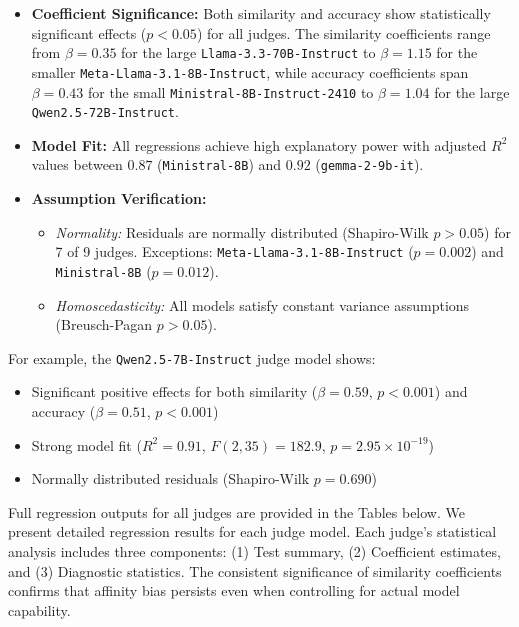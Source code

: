 \begin{itemize}
    \item \textbf{Coefficient Significance:} Both similarity and accuracy show statistically significant effects ($p<0.05$) for all judges. The similarity coefficients range from $\beta=0.35$ for the large \texttt{Llama-3.3-70B-Instruct} to $\beta=1.15$ for the smaller \texttt{Meta-Llama-3.1-8B-Instruct}, while accuracy coefficients span $\beta=0.43$ for the small \texttt{Ministral-8B-Instruct-2410} to $\beta=1.04$ for the large \texttt{Qwen2.5-72B-Instruct}.
    
    \item \textbf{Model Fit:} All regressions achieve high explanatory power with adjusted $R^2$ values between $0.87$ (\texttt{Ministral-8B}) and $0.92$ (\texttt{gemma-2-9b-it}).
    
    \item \textbf{Assumption Verification:}
    \begin{itemize}
        \item \textit{Normality:} Residuals are normally distributed (Shapiro-Wilk $p>0.05$) for 7 of 9 judges. Exceptions: \texttt{Meta-Llama-3.1-8B-Instruct} ($p=0.002$) and \texttt{Ministral-8B} ($p=0.012$).
        \item \textit{Homoscedasticity:} All models satisfy constant variance assumptions (Breusch-Pagan $p>0.05$).
    \end{itemize}
\end{itemize}

For example, the \texttt{Qwen2.5-7B-Instruct} judge model shows:

\begin{itemize}
    \item Significant positive effects for both similarity ($\beta=0.59$, $p<0.001$) and accuracy ($\beta=0.51$, $p<0.001$)
    \item Strong model fit ($R^2=0.91$, $F(2,35)=182.9$, $p=2.95\times10^{-19}$)
    \item Normally distributed residuals (Shapiro-Wilk $p=0.690$)
\end{itemize}

Full regression outputs for all judges are provided in the Tables below. We present detailed regression results for each judge model. Each judge's statistical analysis includes three components: (1) Test summary, (2) Coefficient estimates, and (3) Diagnostic statistics. The consistent significance of similarity coefficients confirms that affinity bias persists even when controlling for actual model capability.

